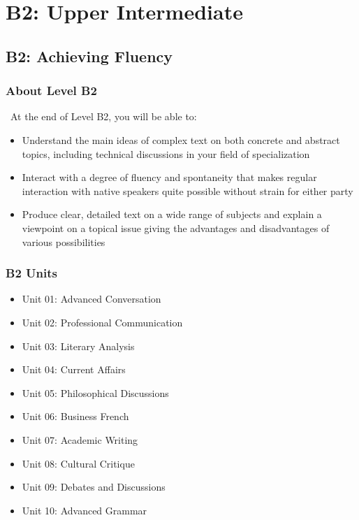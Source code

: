 
\part{B2: Upper Intermediate}
\label{part:b2}

\chapter{B2: Achieving Fluency}
\label{chap:b2}

\section*{About Level B2}

\levelBtwo\ At the end of Level B2, you will be able to:

\begin{itemize}
\item Understand the main ideas of complex text on both concrete and abstract topics, including technical discussions in your field of specialization
\item Interact with a degree of fluency and spontaneity that makes regular interaction with native speakers quite possible without strain for either party
\item Produce clear, detailed text on a wide range of subjects and explain a viewpoint on a topical issue giving the advantages and disadvantages of various possibilities
\end{itemize}

\section*{B2 Units}
\begin{itemize}
\item Unit 01: Advanced Conversation
\item Unit 02: Professional Communication
\item Unit 03: Literary Analysis
\item Unit 04: Current Affairs
\item Unit 05: Philosophical Discussions
\item Unit 06: Business French
\item Unit 07: Academic Writing
\item Unit 08: Cultural Critique
\item Unit 09: Debates and Discussions
\item Unit 10: Advanced Grammar
\end{itemize}

